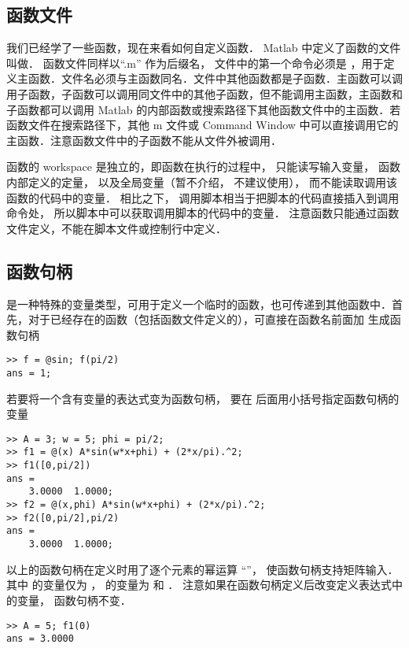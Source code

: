 

\subsection{函数文件}

我们已经学了一些函数，现在来看如何自定义函数． Matlab 中定义了函数的文件叫做． 函数文件同样以“.m” 作为后缀名， 文件中的第一个命令必须是 ，用于定义主函数．文件名必须与主函数同名．文件中其他函数都是子函数．主函数可以调用子函数，子函数可以调用同文件中的其他子函数，但不能调用主函数，主函数和子函数都可以调用 Matlab 的内部函数或搜索路径下其他函数文件中的主函数．若函数文件在搜索路径下，其他 m 文件或 Command Window 中可以直接调用它的主函数．注意函数文件中的子函数不能从文件外被调用．

函数的 workspace 是独立的，即函数在执行的过程中， 只能读写输入变量， 函数内部定义的定量， 以及全局变量（暂不介绍， 不建议使用）， 而不能读取调用该函数的代码中的变量． 相比之下， 调用脚本相当于把脚本的代码直接插入到调用命令处， 所以脚本中可以获取调用脚本的代码中的变量． 注意函数只能通过函数文件定义，不能在脚本文件或控制行中定义．

\subsection{函数句柄}
 是一种特殊的变量类型，可用于定义一个临时的函数，也可传递到其他函数中．首先，对于已经存在的函数（包括函数文件定义的），可直接在函数名前面加  生成函数句柄
\begin{lstlisting}[language=MatlabCom]
>> f = @sin; f(pi/2)
ans = 1;
\end{lstlisting}
若要将一个含有变量的表达式变为函数句柄， 要在  后面用小括号指定函数句柄的变量
\begin{lstlisting}[language=MatlabCom]
>> A = 3; w = 5; phi = pi/2;
>> f1 = @(x) A*sin(w*x+phi) + (2*x/pi).^2;
>> f1([0,pi/2])
ans =
    3.0000  1.0000;
>> f2 = @(x,phi) A*sin(w*x+phi) + (2*x/pi).^2;
>> f2([0,pi/2],pi/2)
ans =
    3.0000  1.0000;
\end{lstlisting}
以上的函数句柄在定义时用了逐个元素的幂运算 “”， 使函数句柄支持矩阵输入． 其中  的变量仅为 ，  的变量为  和 ． 注意如果在函数句柄定义后改变定义表达式中的变量， 函数句柄不变．
\begin{lstlisting}[language=MatlabCom]
>> A = 5; f1(0)
ans = 3.0000
\end{lstlisting}

